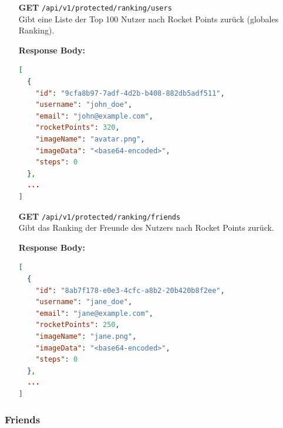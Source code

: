 \documentclass[11pt,a4paper]{article}
\begin{document}
\begin{itemize}[leftmargin=1.5cm]
    \item[\textbf{GET}] \texttt{/api/v1/protected/ranking/users} \\
    Gibt eine Liste der Top 100 Nutzer nach Rocket Points zurück (globales Ranking).

    \textbf{Response Body:}
    \begin{lstlisting}[language=json]
[
  {
    "id": "9cfa8b97-7adf-4d2b-b408-882db5adf511",
    "username": "john_doe",
    "email": "john@example.com",
    "rocketPoints": 320,
    "imageName": "avatar.png",
    "imageData": "<base64-encoded>",
    "steps": 0
  },
  ...
]
    \end{lstlisting}

    \item[\textbf{GET}] \texttt{/api/v1/protected/ranking/friends} \\
    Gibt das Ranking der Freunde des Nutzers nach Rocket Points zurück.

    \textbf{Response Body:}
    \begin{lstlisting}[language=json]
[
  {
    "id": "8ab7f178-e0e3-4cfc-a8b2-20b420b8f2ee",
    "username": "jane_doe",
    "email": "jane@example.com",
    "rocketPoints": 250,
    "imageName": "jane.png",
    "imageData": "<base64-encoded>",
    "steps": 0
  },
  ...
]
    \end{lstlisting}
\end{itemize}

\subsubsection{Friends}
\end{document}
